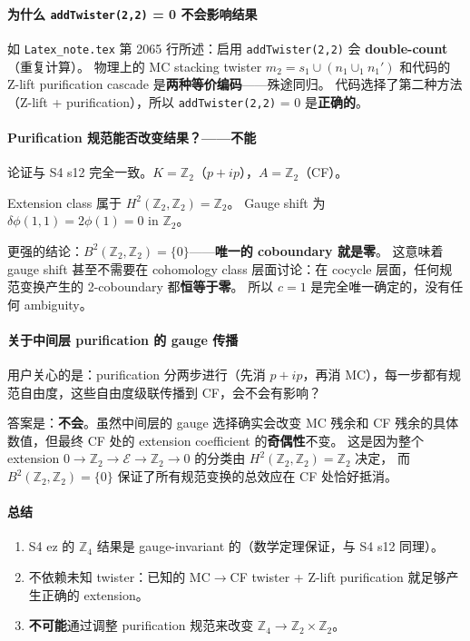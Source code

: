 \documentclass[a4paper,fontset=ubuntu,12pt]{ctexart}
\begin{document}
\paragraph{为什么 \texttt{addTwister(2,2)} = 0 不会影响结果}
如 \texttt{Latex\_note.tex} 第 2065 行所述：启用 \texttt{addTwister(2,2)} 会 \textbf{double-count}（重复计算）。
物理上的 MC stacking twister $m_2 = s_1 \cup (n_1 \cup_1 n_1')$ 和代码的 Z-lift purification cascade 是\textbf{两种等价编码}——殊途同归。
代码选择了第二种方法（Z-lift + purification），所以 \texttt{addTwister(2,2)} = 0 是\textbf{正确的}。

\paragraph{Purification 规范能否改变结果？——不能}
论证与 S4 s12 完全一致。$K = \mathbb{Z}_2$（$p{+}ip$），$A = \mathbb{Z}_2$（CF）。

Extension class 属于 $H^2(\mathbb{Z}_2, \mathbb{Z}_2) = \mathbb{Z}_2$。
Gauge shift 为 $\delta\phi(1,1) = 2\phi(1) = 0$ in $\mathbb{Z}_2$。

更强的结论：$B^2(\mathbb{Z}_2, \mathbb{Z}_2) = \{0\}$——\textbf{唯一的 coboundary 就是零}。
这意味着 gauge shift 甚至不需要在 cohomology class 层面讨论：在 cocycle 层面，任何规范变换产生的 2-coboundary 都\textbf{恒等于零}。
所以 $c = 1$ 是完全唯一确定的，没有任何 ambiguity。

\paragraph{关于中间层 purification 的 gauge 传播}

用户关心的是：purification 分两步进行（先消 $p{+}ip$，再消 MC），每一步都有规范自由度，这些自由度级联传播到 CF，会不会有影响？

答案是：\textbf{不会}。虽然中间层的 gauge 选择确实会改变 MC 残余和 CF 残余的具体数值，但最终 CF 处的 extension coefficient 的\textbf{奇偶性}不变。
这是因为整个 extension $0 \to \mathbb{Z}_2 \to \mathcal{E} \to \mathbb{Z}_2 \to 0$ 的分类由 $H^2(\mathbb{Z}_2, \mathbb{Z}_2) = \mathbb{Z}_2$ 决定，
而 $B^2(\mathbb{Z}_2, \mathbb{Z}_2) = \{0\}$ 保证了所有规范变换的总效应在 CF 处恰好抵消。

\paragraph{总结}
\begin{enumerate}
\item S4 ez 的 $\mathbb{Z}_4$ 结果是 gauge-invariant 的（数学定理保证，与 S4 s12 同理）。
\item 不依赖未知 twister：已知的 MC$\to$CF twister + Z-lift purification 就足够产生正确的 extension。
\item \textbf{不可能}通过调整 purification 规范来改变 $\mathbb{Z}_4 \to \mathbb{Z}_2 \times \mathbb{Z}_2$。
\end{enumerate}
\end{document}
